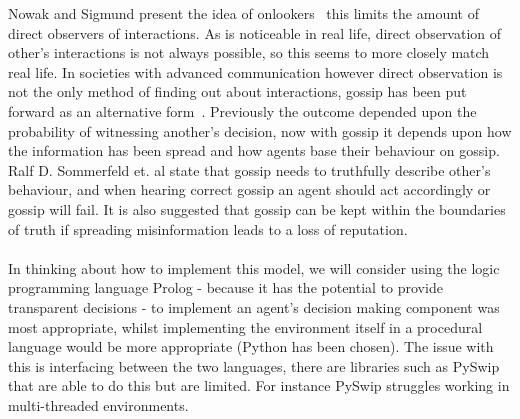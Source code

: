 \documentclass{article}
\begin{document}
Nowak and Sigmund present the idea of onlookers~\cite{evol_indirect_image} this limits the amount of direct observers of interactions. As is noticeable in real life, direct observation of other's interactions is not always possible, so this seems to more closely match real life. In societies with advanced communication however direct observation is not the only method of finding out about interactions, gossip has been put forward as an alternative form~\cite{gossip_alt}. Previously the outcome depended upon the probability of witnessing another's decision, now with gossip it depends upon how the information has been spread and how agents base their behaviour on gossip. Ralf D. Sommerfeld et. al state that gossip needs to truthfully describe other's behaviour, and when hearing correct gossip an agent should act accordingly or gossip will fail. It is also suggested that gossip can be kept within the boundaries of truth if spreading misinformation leads to a loss of reputation.\\\\
In thinking about how to implement this model, we will consider using the logic programming language Prolog  - because it has the potential to provide transparent decisions - to implement an agent's decision making component was most appropriate, whilst implementing the environment itself in a procedural language would be more appropriate (Python has been chosen). The issue with this is interfacing between the two languages, there are libraries such as PySwip~\cite{pyswip} that are able to do this but are limited. For instance PySwip struggles working in multi-threaded environments.
\end{document}
